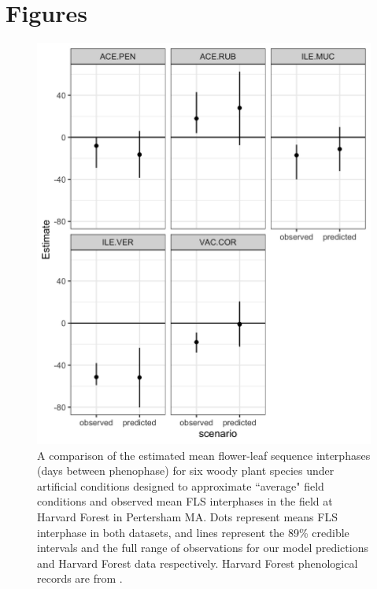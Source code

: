 \documentclass{article}\usepackage[]{graphicx}\usepackage[]{color}
\begin{document}
\section*{Figures}

 \begin{figure}[!ht]
    \centering
 \includegraphics[width=\textwidth]{..//Plots/fieldmodcomparisions.jpeg}
    \caption{A comparison of the estimated mean flower-leaf sequence interphases (days between phenophase) for six woody plant species under artificial conditions designed to approximate ``average" field conditions and observed mean FLS interphases in the field at Harvard Forest in Pertersham MA. Dots represent means FLS interphase in both datasets, and lines represent the 89\% credible intervals and the full range of observations for our model predictions and Harvard Forest data respectively. Harvard Forest phenological records are from \citet{Okeefe2015}.}
    \label{fig:validate}
\end{figure}
\end{document}
